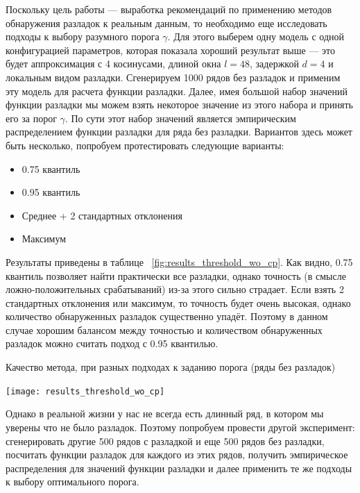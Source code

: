 \documentclass[%
12pt,
master,  %
natbib,      %
subf,        %
substylefile = spbu.rtx,
href,        %
colorlinks,  %
]{disser}
\begin{document}
Поскольку цель работы --- выработка рекомендаций по применению методов обнаружения разладок к реальным данным, то необходимо еще исследовать подходы к выбору разумного порога $\gamma$. Для этого выберем одну модель с одной конфигурацией параметров, которая показала хороший результат выше --- это будет аппроксимация с 4 косинусами, длиной окна $l=48$, задержкой $d=4$ и локальным видом разладки. Сгенерируем 1000 рядов без разладок и применим эту модель для расчета функции разладки. Далее, имея большой набор значений функции разладки мы можем взять некоторое значение из этого набора и принять его за порог $\gamma$. По сути этот набор значений является эмпирическим распределением функции разладки для ряда без разладки.  Вариантов здесь может быть несколько, попробуем протестировать следующие варианты:
\begin{itemize}
	\item 0.75 квантиль
	\item 0.95 квантиль
	\item Среднее + 2 стандартных отклонения
	\item Максимум
\end{itemize}



Результаты приведены в таблице ~\ref{fig:results_threshold_wo_cp}. Как видно, 0.75 квантиль позволяет найти практически все разладки, однако точность (в смысле ложно-положительных срабатываний) из-за этого сильно страдает. Если взять 2 стандартных отклонения или максимум, то точность будет очень высокая, однако количество обнаруженных разладок существенно упадёт. Поэтому в данном случае хорошим балансом между точностью и количеством обнаруженных разладок можно считать подход с 0.95 квантилью.

\begin{table}[!hhh]
	\caption{Качество метода, при разных подходах к заданию порога (ряды без разладок)}
	\begin{center}
		\vspace{-5mm}\texttt{[image: results\_threshold\_wo\_cp]}
	\end{center}
	
	\label{fig:results_threshold_wo_cp}
\end{table}


Однако в реальной жизни у нас не всегда есть длинный ряд, в котором мы уверены что не было разладок. Поэтому попробуем провести другой эксперимент: сгенерировать другие 500 рядов с разладкой и еще 500 рядов без разладки, посчитать функции разладок для каждого из этих рядов, получить эмпирическое распределения для значений функции разладки и далее применить те же подходы к выбору оптимального порога.
\end{document}
